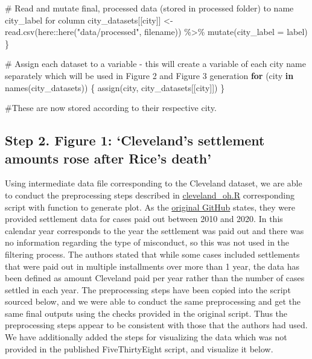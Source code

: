 \documentclass[
  letterpaper,
  DIV=11,
  numbers=noendperiod]{scrartcl}
\newenvironment{Shaded}{\begin{snugshade}}{\end{snugshade}}
\newcommand{\AttributeTok}[1]{\textcolor[rgb]{0.40,0.45,0.13}{#1}}
\newcommand{\CommentTok}[1]{\textcolor[rgb]{0.37,0.37,0.37}{#1}}
\newcommand{\ControlFlowTok}[1]{\textcolor[rgb]{0.00,0.23,0.31}{\textbf{#1}}}
\newcommand{\FunctionTok}[1]{\textcolor[rgb]{0.28,0.35,0.67}{#1}}
\newcommand{\NormalTok}[1]{\textcolor[rgb]{0.00,0.23,0.31}{#1}}
\newcommand{\OtherTok}[1]{\textcolor[rgb]{0.00,0.23,0.31}{#1}}
\newcommand{\SpecialCharTok}[1]{\textcolor[rgb]{0.37,0.37,0.37}{#1}}
\newcommand{\StringTok}[1]{\textcolor[rgb]{0.13,0.47,0.30}{#1}}
\begin{document}
\begin{Shaded}
\begin{Highlighting}[]
  \CommentTok{\# Read and mutate final, processed data (stored in processed folder) to name city\_label for column}
\NormalTok{  city\_datasets[[city]] }\OtherTok{\textless{}{-}} \FunctionTok{read.csv}\NormalTok{(here}\SpecialCharTok{::}\FunctionTok{here}\NormalTok{(}\StringTok{"data/processed"}\NormalTok{, filename)) }\SpecialCharTok{\%\textgreater{}\%}
    \FunctionTok{mutate}\NormalTok{(}\AttributeTok{city\_label =}\NormalTok{ label)}
\NormalTok{\}}

\CommentTok{\# Assign each dataset to a variable {-} this will create a variable of each city name separately which will be used in Figure 2 and Figure 3 generation}
\ControlFlowTok{for}\NormalTok{ (city }\ControlFlowTok{in} \FunctionTok{names}\NormalTok{(city\_datasets)) \{}
  \FunctionTok{assign}\NormalTok{(city, city\_datasets[[city]])}
\NormalTok{\}}

\CommentTok{\#These are now stored according to their respective city.}
\end{Highlighting}
\end{Shaded}

\subsection{Step 2. Figure 1: `Cleveland's settlement amounts rose after
Rice's
death'}\label{step-2.-figure-1-clevelands-settlement-amounts-rose-after-rices-death}

Using intermediate data file corresponding to the Cleveland dataset, we
are able to conduct the preprocessing steps described in
\href{'https://github.com/fivethirtyeight/police-settlements/blob/main/cleveland_oh/cleveland_oh.R'}{cleveland\_oh.R}
corresponding script with function to generate plot. As the
\href{'https://github.com/fivethirtyeight/police-settlements/blob/main/cleveland_oh/README.md'}{original
GitHub} states, they were provided settlement data for cases paid out
between 2010 and 2020. In this calendar year corresponds to the year the
settlement was paid out and there was no information regarding the type
of misconduct, so this was not used in the filtering process. The
authors stated that while some cases included settlements that were paid
out in multiple installments over more than 1 year, the data has been
defined as amount Cleveland paid per year rather than the number of
cases settled in each year. The preprocessing steps have been copied
into the script sourced below, and we were able to conduct the same
preprocessing and get the same final outputs using the checks provided
in the original script. Thus the preprocessing steps appear to be
consistent with those that the authors had used. We have additionally
added the steps for visualizing the data which was not provided in the
published FiveThirtyEight script, and visualize it below.
\end{document}
